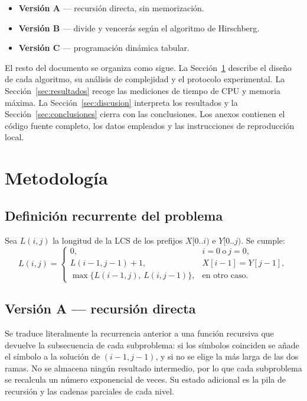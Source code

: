 \documentclass[11pt,a4paper]{article}
\begin{document}
\begin{itemize}
    \item \textbf{Versión A} — recursión directa, sin memorización.
    \item \textbf{Versión B} — divide y vencerás según el algoritmo de
          Hirschberg.
    \item \textbf{Versión C} — programación dinámica tabular.
\end{itemize}

El resto del documento se organiza como sigue. La
Sección~\ref{sec:metodologia} describe el diseño de cada algoritmo, su
análisis de complejidad y el protocolo experimental. La
Sección~\ref{sec:resultados} recoge las mediciones de tiempo de CPU y
memoria máxima. La Sección~\ref{sec:discusion} interpreta los resultados
y la Sección~\ref{sec:conclusiones} cierra con las conclusiones. Los
anexos contienen el código fuente completo, los datos empleados y las
instrucciones de reproducción local.

\section{Metodología}\label{sec:metodologia}

\subsection{Definición recurrente del problema}

Sea $L(i,j)$ la longitud de la LCS de los prefijos $X[0..i)$ e $Y[0..j)$.
Se cumple:
\[
L(i,j)=
\begin{cases}
0, & i=0\ \text{o}\ j=0,\\[2pt]
L(i-1,j-1)+1, & X[i-1]=Y[j-1],\\[2pt]
\max\{L(i-1,j),\,L(i,j-1)\}, & \text{en otro caso}.
\end{cases}
\]

\subsection{Versión A — recursión directa}

Se traduce literalmente la recurrencia anterior a una función recursiva
que devuelve la subsecuencia de cada subproblema: si los símbolos
coinciden se añade el símbolo a la solución de $(i-1,j-1)$, y si no se
elige la más larga de las dos ramas. No se almacena ningún resultado
intermedio, por lo que cada subproblema se recalcula un número
exponencial de veces. Su estado adicional es la pila de recursión y las
cadenas parciales de cada nivel.
\end{document}
